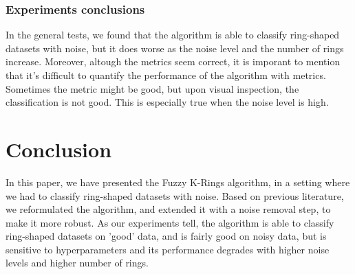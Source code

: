 \documentclass[conference]{IEEEtran}
\begin{document}
\subsubsection{Experiments conclusions}
In the general tests, we found that the algorithm is able to classify ring-shaped datasets with noise, but it does worse as the noise level and the number of rings increase.
Moreover, altough the metrics seem correct, it is imporant to mention that it's difficult to quantify the performance of the algorithm with metrics. Sometimes the metric might
be good, but upon visual inspection, the classification is not good. This is especially true when the noise level is high.


\section{Conclusion}
In this paper, we have presented the Fuzzy K-Rings algorithm, in a setting where we had to classify ring-shaped datasets with noise. Based on previous literature,
we reformulated the algorithm, and extended it with a noise removal step, to make it more robust. As our experiments tell, the algorithm is able to classify ring-shaped datasets
on 'good' data, and is fairly good on noisy data, but is sensitive to hyperparameters and its performance degrades with higher noise levels and higher number of rings.





\vspace{12pt}
\color{red}
\end{document}
